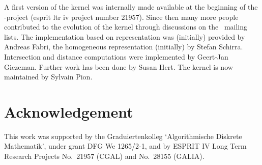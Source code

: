 A first version of the kernel was internally made available at the beginning
of the \cgal-project ({\sc esprit ltr iv} project number 21957).
Since then many more people contributed to the evolution of the kernel
through discussions on the \cgal\ mailing lists.
The implementation based on 
 representation was (initially) provided 
by Andreas Fabri, the homogeneous representation (initially) by Stefan Schirra.
Intersection and distance computations were implemented by Geert-Jan Giezeman.
Further work has been done by Susan Hert.
The kernel is now maintained by Sylvain Pion.

\section*{Acknowledgement}

This work was supported
by the Graduiertenkolleg `Algorithmische Diskrete Mathematik',
under grant DFG We 1265/2-1,
and by ESPRIT IV Long Term Research Projects No.~21957 (CGAL)
and No.~28155 (GALIA).

